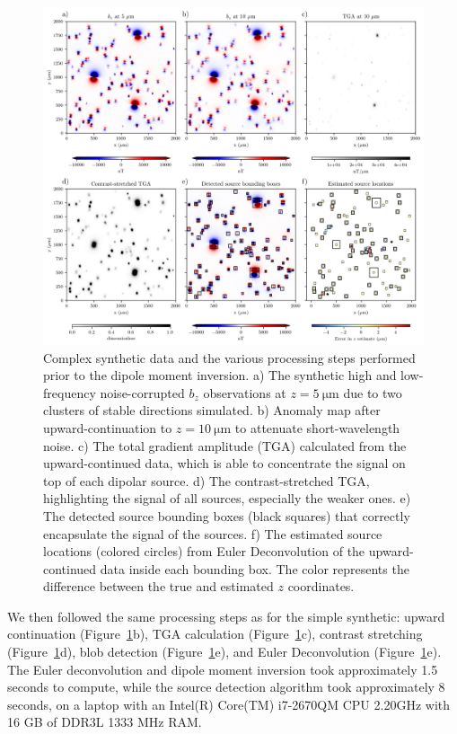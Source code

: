 \begin{figure}[tb!]
  \centering
  \includegraphics[width=1\linewidth]{figures/complex-synthetic-data.png}
  \caption{
    Complex synthetic data and the various processing steps performed prior to the dipole moment inversion.
    a) The synthetic high and low-frequency noise-corrupted $b_z$ observations at
    $z = \qty{5}{\micro\meter}$ due to two clusters of stable directions simulated.
    b) Anomaly map after upward-continuation to $z = \qty{10}{\micro\meter}$ to attenuate short-wavelength noise.
    c) The total gradient amplitude (TGA) calculated from the
    upward-continued data, which is able to concentrate the signal on top
    of each dipolar source.
    d) The contrast-stretched TGA, highlighting the signal of all sources, especially the weaker ones.
    e) The detected source bounding boxes (black squares) that correctly
    encapsulate the signal of the sources.
    f) The estimated source locations (colored circles) from Euler
    Deconvolution of the upward-continued data inside each bounding box.
    The color represents the difference between the true and estimated
    $z$ coordinates.
  }
  \label{complex-synthetic-data}
\end{figure}

We then followed the same processing steps as for the simple synthetic: upward continuation (Figure~\ref{complex-synthetic-data}b),
TGA calculation (Figure~\ref{complex-synthetic-data}c), contrast stretching (Figure~\ref{complex-synthetic-data}d), blob detection (Figure~\ref{complex-synthetic-data}e), and Euler Deconvolution (Figure~\ref{complex-synthetic-data}e).
The Euler deconvolution and dipole moment inversion took approximately 1.5 seconds to compute, while
the source detection algorithm took approximately 8 seconds, on a laptop with an Intel(R) Core(TM) i7-2670QM CPU 2.20GHz with 16 GB of DDR3L 1333 MHz RAM.


